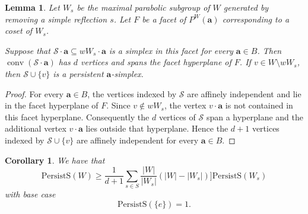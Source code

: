 \documentclass{amsart}
\newtheorem{lem}[thm]{Lemma}
\newtheorem{corollary}[thm]{Corollary}
\theoremstyle{definition}
\def\ba{\mathbf{a}}
\def\wperm_#1{P^W(#1)}
\def\cS{\mathcal{S}}
\DeclareMathOperator{\conv}{conv}
\def\psimp{\mathrm{PersistS}}
\begin{document}
\begin{lem}\label{lem:facet-lifting}
Let $W_s$ be the maximal parabolic subgroup of $W$ generated by removing a simple reflection $s$. Let $F$ be a facet of $\wperm_\ba$ corresponding to a coset of $W_s$.

Suppose that \(\cS \cdot \ba\subseteq wW_s \cdot \ba\) is a simplex in
this facet for every $\ba\in B$. Then \(\conv(\cS \cdot \ba)\) has \(d\) vertices and spans the facet hyperplane of
\(F\). If \(v\in W\setminus wW_s\), then
\(\cS\cup\{v\}\) is a persistent $\ba$-simplex. 
\end{lem}

\begin{proof}
For every \(\ba\in B\), the vertices indexed by \(\cS\) are affinely
independent and lie in the facet hyperplane of \(F\). Since
\(v\notin wW_s\), the vertex \(v\cdot\ba\) is not contained in this facet hyperplane.
Consequently the \(d\) vertices of \(\cS\) span a hyperplane and the additional
vertex \(v\cdot\ba\) lies outside that hyperplane. Hence the \(d+1\) vertices indexed
by \(\cS\cup\{v\}\) are affinely independent for every \(\ba\in B\).
\end{proof}

\begin{corollary}\label{cor:recursive-lower-bound}
We have that 
\[
\psimp(W)
\ge
\frac{1}{d+1}
\sum_{s\in S}
\frac{|W|}{|W_s|}
\left(|W|-|W_s|\right)
]\psimp(W_{s})
\]
with base case
\[
\psimp(\{e\})=1.
\]
\end{corollary}
\end{document}
